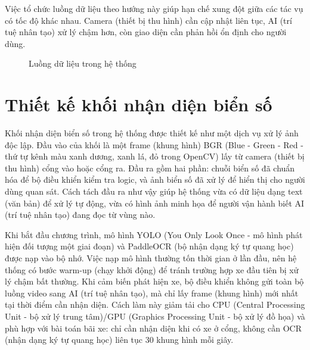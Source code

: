 \documentclass[a4paper,14pt]{extreport}
\begin{document}
Việc tổ chức luồng dữ liệu theo hướng này giúp hạn chế xung đột giữa các tác vụ có tốc độ khác nhau. Camera (thiết bị thu hình) cần cập nhật liên tục, AI (trí tuệ nhân tạo) xử lý chậm hơn, còn giao diện cần phản hồi ổn định cho người dùng.

\begin{figure}[H]
\centering
{}
\caption{Luồng dữ liệu trong hệ thống}
\label{fig:luong_du_lieu}
\end{figure}

\section{Thiết kế khối nhận diện biển số}

Khối nhận diện biển số trong hệ thống được thiết kế như một dịch vụ xử lý ảnh độc lập. Đầu vào của khối là một frame (khung hình) BGR (Blue - Green - Red - thứ tự kênh màu xanh dương, xanh lá, đỏ trong OpenCV) lấy từ camera (thiết bị thu hình) cổng vào hoặc cổng ra. Đầu ra gồm hai phần: chuỗi biển số đã chuẩn hóa để bộ điều khiển kiểm tra logic, và ảnh biển số đã xử lý để hiển thị cho người dùng quan sát. Cách tách đầu ra như vậy giúp hệ thống vừa có dữ liệu dạng text (văn bản) để xử lý tự động, vừa có hình ảnh minh họa để người vận hành biết AI (trí tuệ nhân tạo) đang đọc từ vùng nào.

Khi bắt đầu chương trình, mô hình YOLO (You Only Look Once - mô hình phát hiện đối tượng một giai đoạn) và PaddleOCR (bộ nhận dạng ký tự quang học) được nạp vào bộ nhớ. Việc nạp mô hình thường tốn thời gian ở lần đầu, nên hệ thống có bước warm-up (chạy khởi động) để tránh trường hợp xe đầu tiên bị xử lý chậm bất thường. Khi cảm biến phát hiện xe, bộ điều khiển không gửi toàn bộ luồng video sang AI (trí tuệ nhân tạo), mà chỉ lấy frame (khung hình) mới nhất tại thời điểm cần nhận diện. Cách làm này giảm tải cho CPU (Central Processing Unit - bộ xử lý trung tâm)/GPU (Graphics Processing Unit - bộ xử lý đồ họa) và phù hợp với bài toán bãi xe: chỉ cần nhận diện khi có xe ở cổng, không cần OCR (nhận dạng ký tự quang học) liên tục 30 khung hình mỗi giây.
\end{document}
